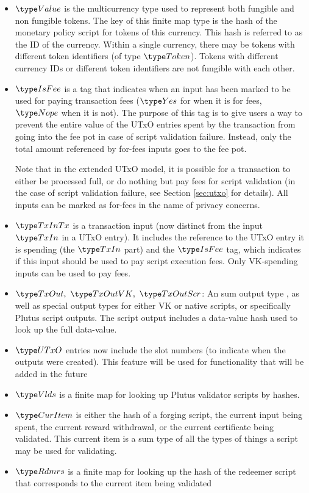 \begin{itemize}
  \item $\Value$ is the multicurrency type used to represent
  both fungible and non fungible tokens. The key of this finite map type is
  the hash of the monetary policy script for tokens of this currency.
  This hash is referred to as the ID of the currency. Within a single
  currency, there may be tokens with different token identifiers
  (of type $\Token$). Tokens with different currency IDs
  or different token identifiers are not fungible with each other.

  \item $\IsFee$ is a tag that indicates when an input has been marked
  to be used for paying transaction fees ($\Yes$ for when it is for fees,
  $\Nope$ when it is not). The purpose of this tag is to give users a way to prevent
  the entire value of the UTxO entries spent by the transaction
  from going into the fee pot in case of script validation failure.
  Instead, only the total amount referenced by for-fees inputs goes
  to the fee pot.

  Note that in the extended UTxO model, it is possible for a transaction
  to either be processed full, or do nothing but pay fees for script
  validation (in the case of script validation failure, see Section
  \ref{sec:utxo} for details). All inputs can be marked as for-fees in
  the name of privacy concerns.

  \item $\TxInTx$ is a transaction input (now distinct from the input $\TxIn$ in
  a UTxO entry). It includes the reference to the UTxO entry it is spending
  (the $\TxIn$ part) and the $\IsFee$ tag, which indicates if this input should
  be used to pay script execution fees. Only VK-spending inputs can be used to
  pay fees.

  \item $\TxOut,~\TxOutVK,~\TxOutScr$: An sum output type ,
  as well as special output types for either VK or native scripts, or
  specifically Plutus script outputs. The script output
  includes a data-value hash used to look up the full data-value.

  \item $\UTxO$ entries now include the slot numbers (to indicate when the
  outputs were created).
  This feature will be used for functionality that will be added in the future

  \item $\Vlds$ is a finite map for looking up Plutus
  validator scripts by hashes.

  \item $\CurItem$ is either the hash of a
  forging script, the current input being
  spent, the current reward
  withdrawal, or the current certificate being validated.
  This current item is a sum type of all the types of things a script may be used
  for validating.

  \item $\Rdmrs$ is a finite map for looking up the hash of the redeemer script
  that corresponds to the current item being validated
\end{itemize}


